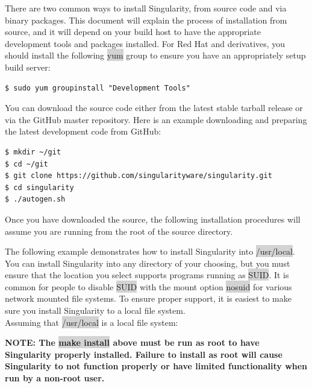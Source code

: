 \documentclass[a4paper]{article}
\newcounter{subsubsubsection}[subsubsection]
\begin{document}
There are two common ways to install Singularity, from source code and via binary packages. This document will explain the process of installation from source, and it will depend on your build host to have the appropriate development tools and packages installed. For Red Hat and derivatives, you should install the following \colorbox{lightgray}{yum} group to ensure you have an appropriately setup build server:
    
\begin{lstlisting}[frame=single]
$ sudo yum groupinstall "Development Tools"
\end{lstlisting}



You can download the source code either from the latest stable tarball release or via the GitHub master repository. Here is an example downloading and preparing the latest development code from GitHub:

\begin{lstlisting}[frame=single]
$ mkdir ~/git
$ cd ~/git
$ git clone https://github.com/singularityware/singularity.git
$ cd singularity
$ ./autogen.sh
\end{lstlisting}

Once you have downloaded the source, the following installation procedures will assume you are running from the root of the source directory.
\\[0.1in]


The following example demonstrates how to install Singularity into \colorbox{lightgray}{/usr/local}. You can install Singularity into any directory of your choosing, but you must ensure that the location you select supports programs running as \colorbox{lightgray}{SUID}. It is common for people to disable \colorbox{lightgray}{SUID} with the mount option \colorbox{lightgray}{nosuid} for various network mounted file systems. To ensure proper support, it is easiest to make sure you install Singularity to a local file system.\\[0.1in]

Assuming that \colorbox{lightgray}{/usr/local} is a local file system:


\textbf{NOTE: The \colorbox{lightgray}{make install} above must be run as root to have Singularity properly installed. Failure to install as root will cause Singularity to not function properly or have limited functionality when run by a non-root user.}\\[0.1in]
\end{document}
